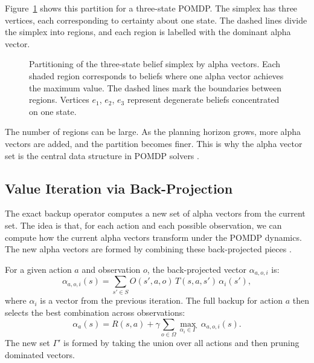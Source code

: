 Figure~\ref{fig:simplex} shows this partition for a three-state POMDP.
The simplex has three vertices, each corresponding to certainty about one state.
The dashed lines divide the simplex into regions, and each region is labelled with the dominant alpha vector.

\begin{figure}[htbp]
  \centering
  
  \caption{
    Partitioning of the three-state belief simplex by alpha vectors.
    Each shaded region corresponds to beliefs where one alpha vector achieves the maximum value.
    The dashed lines mark the boundaries between regions.
    Vertices $e_1$, $e_2$, $e_3$ represent degenerate beliefs concentrated on one state.
  }
  \label{fig:simplex}
\end{figure}

The number of regions can be large.
As the planning horizon grows, more alpha vectors are added, and the partition becomes finer.
This is why the alpha vector set is the central data structure in POMDP solvers \cite{shaniSurveyPointbasedPOMDP2013}.


\subsection{Value Iteration via Back-Projection}

The exact backup operator computes a new set of alpha vectors from the current set.
The idea is that, for each action and each possible observation, we can compute how the current alpha vectors transform under the POMDP dynamics.
The new alpha vectors are formed by combining these back-projected pieces \cite{smallwood1973optimal,hauskrechtValuefunctionApproximationsPartially2000}.

For a given action $a$ and observation $o$, the back-projected vector $\alpha_{a,o,i}$ is:
\begin{equation}
  \alpha_{a,o,i}(s) = \sum_{s' \in S} O(s', a, o)\, T(s, a, s')\, \alpha_i(s'),
\end{equation}
where $\alpha_i$ is a vector from the previous iteration.
The full backup for action $a$ then selects the best combination across observations:
\begin{equation}
  \alpha_a(s) = R(s, a) + \gamma \sum_{o \in \Omega} \max_{\alpha_i \in \Gamma}\; \alpha_{a,o,i}(s).
\end{equation}
The new set $\Gamma'$ is formed by taking the union over all actions and then pruning dominated vectors.

